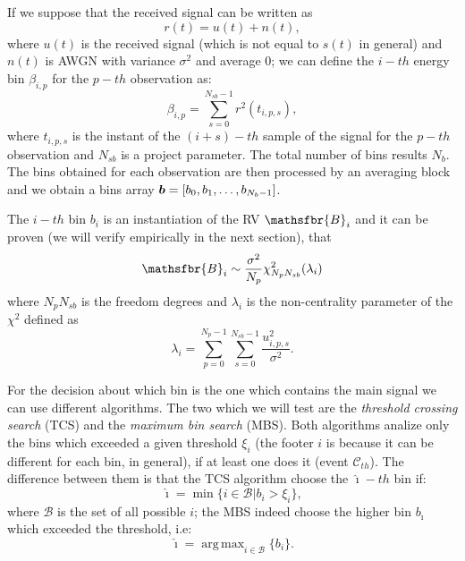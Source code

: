 \documentclass[%
    twoside, 
    a4paper
    ]{article}
\DeclareMathOperator*{\argmax}{arg\,max}
\newcommand{\Vector}[1]{\bm{\MakeLowercase{#1}}}
\DeclareRobustCommand{\msf}[1]{%
  \ifcat\noexpand#1\relax\msfgreek{#1}\else\mathsfbr{#1}\fi%
}
\begin{document}
  If we suppose that the received signal can be written as
  \begin{equation}
    r(t) = u(t) + n(t),
  \end{equation}
  where $u(t)$ is the received signal (which is not equal to $s(t)$ in general) and $n(t)$ is AWGN with 
  variance $\sigma^2$ and average $0$; we can define
  the $i-th$ energy bin $\beta_{i,p}$ for the $p-th$ observation as:
  \begin{equation}
    \beta_{i,p} = \sum_{s=0}^{N_{sb}-1} r^2(t_{i,p,s}),
  \end{equation}
  where $t_{i,p,s}$ is the instant of the $(i+s)-th$ sample of the signal for the $p-th$ observation and 
  $N_{sb}$ is a project parameter. The total number of bins results $N_b$. 
  The bins obtained for each observation are then processed by an averaging block and we obtain a bins array
  $\Vector{b} = \left[b_0, b_1, \dots, b_{N_b-1}\right]$.
  
  The $i-th$ bin $b_i$ is an instantiation of the RV $\msf{B}_i$ and it can be proven (we will verify
  empirically in the next section), that
  \begin{equation}
    \msf{B}_i \sim \frac{\sigma^2}{N_p} \chi^2_{N_p N_{sb}}(\lambda_i)
    \label{eq:bin_dist}
  \end{equation}
  where $N_p N_{sb}$ is the freedom degrees and $\lambda_i$ is the non-centrality parameter of the $\chi^2$
  defined as
  \begin{equation}
    \lambda_i = \sum_{p=0}^{N_p-1} \sum_{s=0}^{N_{sb}-1} \frac{u_{i,p,s}^2}{\sigma^2}.
    \label{eq:lambda_par}
  \end{equation}

  For the decision about which bin is the one which contains the main signal we can use different algorithms.
  The two which we will test are the \emph{threshold crossing search} (TCS) and the \emph{maximum bin search}
  (MBS).
  Both algorithms analize only the bins which exceeded a given threshold $\xi_i$ (the footer $i$ is because it can 
  be different for each bin, in general), if at least one does it (event $\mathcal{C}_{th}$). The difference
  between them is that the TCS algorithm choose the $\hat{\imath}-th$ bin if:
  \begin{equation}
    \hat{\imath} = \min\{i \in \mathcal{B} | b_i > \xi_i\},
  \end{equation}
  where $\mathcal{B}$ is the set of all possible $i$;
  the MBS indeed choose the higher bin $b_{\hat{\imath}}$ which exceeded the threshold, i.e:
  \begin{equation}
    \hat{\imath} = \argmax_{i \in \mathcal{B}}\{b_i\}.
  \end{equation}
\end{document}
